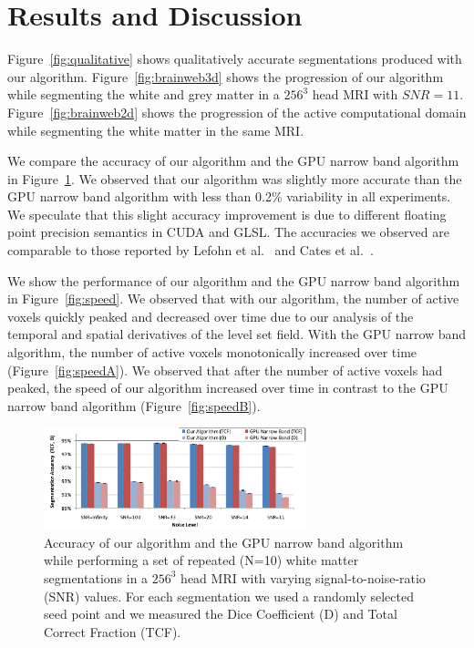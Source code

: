 \documentclass{egpubl}
\begin{document}
{{%
\section{Results and Discussion}
\label{sec:results}

Figure~\ref{fig:qualitative} shows qualitatively accurate segmentations produced with our algorithm. Figure~\ref{fig:brainweb3d} shows the progression of our algorithm while segmenting the white and grey matter in a ${256}^3$ head MRI with $SNR=11$. Figure~\ref{fig:brainweb2d} shows the progression of the active computational domain while segmenting the white matter in the same MRI.

We compare the accuracy of our algorithm and the GPU narrow band algorithm in Figure~\ref{fig:8}. We observed that our algorithm was slightly more accurate than the GPU narrow band algorithm with less than 0.2\% variability in all experiments. We speculate that this slight accuracy improvement is due to different floating point precision semantics in CUDA and GLSL. The accuracies we observed are comparable to those reported by Lefohn et al.~\cite{Lefohn-2003-MICCAI} and Cates et al.~\cite{Cates-2004}.

We show the performance of our algorithm and the GPU narrow band algorithm in Figure~\ref{fig:speed}. We observed that with our algorithm, the number of active voxels quickly peaked and decreased over time due to our analysis of the temporal and spatial derivatives of the level set field. With the GPU narrow band algorithm, the number of active voxels monotonically increased over time (Figure~\ref{fig:speedA}). We observed that after the number of active voxels had peaked, the speed of our algorithm increased over time in contrast to the GPU narrow band algorithm (Figure~\ref{fig:speedB}).


\begin{figure}[t]
\centering
\includegraphics[width=3.0in]{figures/Accuracy.pdf}
\caption{Accuracy of our algorithm and the GPU narrow band algorithm while performing a set of repeated (N=10) white matter segmentations in a $256^3$ head MRI with varying signal-to-noise-ratio (SNR) values. For each segmentation we used a randomly selected seed point and we measured the Dice Coefficient (D) and Total Correct Fraction (TCF). }
\label{fig:8}


\end{figure}}}
\end{document}
